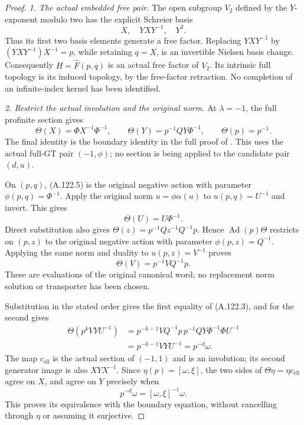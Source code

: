 \begin{proof}
\emph{1. The actual embedded free pair.}
The open subgroup \(V_2\) defined by the \(Y\)-exponent modulo two
has the explicit Schreier basis
\[
 X,\quad YXY^{-1},\quad Y^2 .
\]
Thus its first two basis elements generate a free factor. Replacing
\(YXY^{-1}\) by \((YXY^{-1})X^{-1}=p\), while retaining \(q=X\),
is an invertible Nielsen basis change. Consequently
\(H=\widehat F(p,q)\) is an actual free factor of \(V_2\).
Its intrinsic full topology is its induced topology, by the
free-factor retraction. No completion of an infinite-index kernel
has been identified.

\emph{2. Restrict the actual involution and the original norm.}
At \(\lambda=-1\), the full profinite section gives
\[
 \Theta(X)=\Phi X^{-1}\Phi^{-1},\qquad
 \Theta(Y)=p^{-1}QY\Phi^{-1},\qquad
 \Theta(p)=p^{-1}.                                           \tag{A.122.5}
\]
The final identity is the boundary identity in the full proof of
\citet[Proposition~2.20]{A_Enriquez2014}.
This uses the actual full-GT pair \((-1,\phi)\); no section is
being applied to the candidate pair \((d,u)\).

On \((p,q)\), (A.122.5) is the original negative action with
parameter \(\phi(p,q)=\Phi^{-1}\). Apply the original norm
\(u=\phi\alpha(u)\) to \(u(p,q)=U^{-1}\) and invert. This gives
\[
 \Theta(U)=U\Phi^{-1}.                                       \tag{A.122.6}
\]
Direct substitution also gives
\(\Theta(z)=p^{-1}Qz^{-1}Q^{-1}p\).
Hence \(\operatorname{Ad}(p)\Theta\) restricts on \((p,z)\)
to the original negative action with parameter
\(\phi(p,z)=Q^{-1}\). Applying the same norm and duality to
\(u(p,z)=V^{-1}\) proves
\[
 \Theta(V)=p^{-1}VQ^{-1}p.                                   \tag{A.122.7}
\]
These are evaluations of the original canonical word; no
replacement norm solution or transporter has been chosen.

Substitution in the stated order gives the first equality of
(A.122.3), and for the second gives
\[
 \begin{aligned}
 \Theta(p^kVYU^{-1})
 &=p^{-k-1}VQ^{-1}p\,p^{-1}QY\Phi^{-1}\Phi U^{-1}\\
 &=p^{-k-1}VYU^{-1}=p^{-d}\omega .
 \end{aligned}
\]
The map \(c_{\mathrm{ell}}\) is the actual section of \((-1,1)\)
and is an involution; its second generator image is also
\(XYX^{-1}\).
Since \(\eta(p)=[\omega,\xi]\), the two sides of
\(\Theta\eta=\eta c_{\mathrm{ell}}\) agree on \(X\), and agree
on \(Y\) precisely when
\[
 p^{-d}\omega=[\omega,\xi]^{-1}\omega.
\]
This proves its equivalence with the boundary equation, without
cancelling through \(\eta\) or assuming it surjective.


\end{proof}
